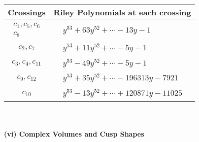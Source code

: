 \documentclass[1p]{elsarticle_modified}
\theoremstyle{definition}
\begin{document}
\begin{tabular}{m{50pt}|m{274pt}}
Crossings & \hspace{64pt}Riley Polynomials at each crossing \\
\hline $$\begin{aligned}c_{1},c_{5},c_{6}\\c_{8}\end{aligned}$$&$\begin{aligned}
&y^{53}+63 y^{52}+\cdots-13 y-1
\end{aligned}$\\
\hline $$\begin{aligned}c_{2},c_{7}\end{aligned}$$&$\begin{aligned}
&y^{53}+11 y^{52}+\cdots-5 y-1
\end{aligned}$\\
\hline $$\begin{aligned}c_{3},c_{4},c_{11}\end{aligned}$$&$\begin{aligned}
&y^{53}-49 y^{52}+\cdots-5 y-1
\end{aligned}$\\
\hline $$\begin{aligned}c_{9},c_{12}\end{aligned}$$&$\begin{aligned}
&y^{53}+35 y^{52}+\cdots-196313 y-7921
\end{aligned}$\\
\hline $$\begin{aligned}c_{10}\end{aligned}$$&$\begin{aligned}
&y^{53}-13 y^{52}+\cdots+120871 y-11025
\end{aligned}$\\
\hline
\end{tabular}\\~\\
\newpage\flushleft \textbf{(vi) Complex Volumes and Cusp Shapes}
\end{document}
